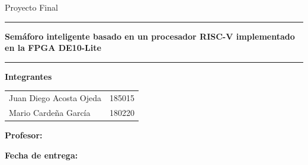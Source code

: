 \documentclass[12pt,letterpaper]{article}
\begin{document}
\begin{titlepage}
  \centering
  {\Large \textbf{\universidad}\par}
  \vspace{0.3cm}
  {\large \facultad\par}
  \vspace{1.5cm}
  {\large \materia\par}
  \vspace{0.5cm}
  {\Large Proyecto Final\par}
  \vspace{1.2cm}
  \rule{\linewidth}{0.8pt}\par
  \vspace{0.4cm}
  {\huge \textbf{Semáforo inteligente basado en un procesador RISC-V implementado en la FPGA DE10-Lite}\par}
  \vspace{0.4cm}
  \rule{\linewidth}{0.8pt}\par
  \vspace{1.5cm}
  {\large \textbf{Integrantes}\par}
  \vspace{0.3cm}
  \begin{tabular}{ll}
    Juan Diego Acosta Ojeda & 185015 \\
    Mario Cardeña García & 180220 \\
  \end{tabular}
  \vfill
  {\large \textbf{Profesor:} \profesor\par}
  \vspace{0.3cm}
  {\large \textbf{Fecha de entrega:} \fechaentrega\par}
\end{titlepage}
\end{document}
